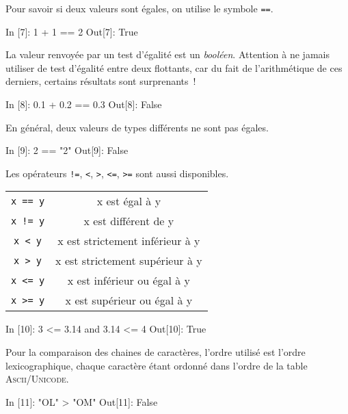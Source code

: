 \documentclass{magnolia}
\begin{document}
Pour savoir si deux valeurs sont égales, on utilise le symbole \og\verb_==_\fg.

\begin{pythoncode}
In [7]: 1 + 1 == 2
Out[7]: True
\end{pythoncode}

\noindent La valeur renvoyée par un test d'égalité est un \emph{booléen}. Attention
à ne jamais utiliser de test d'égalité entre deux flottants, car du fait de l'arithmétique
de ces derniers, certains résultats sont surprenants~!

\begin{pythoncode}
In [8]: 0.1 + 0.2 == 0.3
Out[8]: False
\end{pythoncode}

En général, deux valeurs de types différents ne sont pas égales.
\begin{pythoncode}
In [9]: 2 == "2"
Out[9]: False
\end{pythoncode}
\noindent
Les opérateurs \verb_!=_, \verb_<_, \verb_>_, \verb_<=_, \verb_>=_ sont aussi disponibles.

\begin{center}
\begin{tabular}{cc}
\hline
\verb_x == y_& x est égal à y\\
\verb_x != y_ & x est différent de y\\
\verb_x < y_ & x est strictement inférieur à y\\
\verb_x > y_ & x est strictement supérieur à y\\
\verb_x <= y_ & x est inférieur ou égal à y\\
\verb_x >= y_ & x est supérieur ou égal à y\\
\hline
\end{tabular}
\end{center}

\begin{pythoncode}
In [10]: 3 <= 3.14 and 3.14 <= 4
Out[10]: True
\end{pythoncode}



Pour la comparaison des chaines de caractères, l'ordre utilisé est l'ordre
lexicographique, chaque caractère étant ordonné dans l'ordre de la table
\textsc{Ascii}/\textsc{Unicode}.

\begin{pythoncode}
In [11]: "OL" > "OM"
Out[11]: False
\end{pythoncode}
\end{document}
